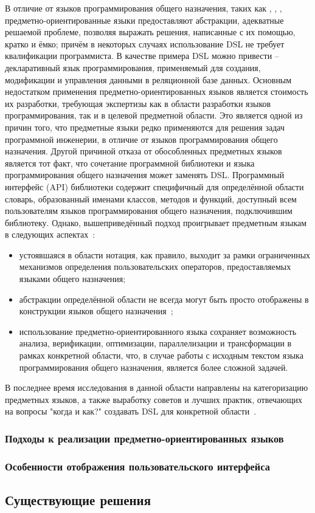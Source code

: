В отличие от языков программирования общего назначения, таких как ,
, , предметно-ориентированные языки предоставляют
абстракции, адекватные решаемой проблеме, позволяя выражать решения,
написанные с их помощью, кратко и ёмко; причём в некоторых случаях
использование DSL не требует квалификации программиста.
В качестве примера DSL можно привести  --  декларативный язык
программирования, применяемый для создания, модификации и управления данными в
реляционной базе данных.
Основным недостатком применения предметно-ориентированных языков является
стоимость их разработки, требующая экспертизы как в области разработки языков
программирования, так и в целевой предметной области.
Это является одной из причин того, что предметные языки редко применяются
для решения задач программной инженерии, в отличие от языков программирования
общего назначения.
Другой причиной отказа от обособленных предметных языков является тот факт,
что сочетание программной библиотеки и языка программирования общего
назначения может заменять DSL.
Программный интерфейс (API) библиотеки содержит специфичный для определённой
области словарь, образованный именами классов, методов и функций, доступный
всем пользователям языков программирования общего назначения, подключившим
библиотеку.
Однако, вышеприведённый подход проигрывает предметным языкам в следующих
аспектах~\cite{when-and-how-develop-dsl,dsl-spectrum-wile}:
\begin{itemize}
	\item устоявшаяся в области нотация, как правило, выходит за рамки
	ограниченных механизмов определения пользовательских операторов,
	предоставляемых языками общего назначения;
	\item абстракции определённой области не всегда могут быть
	просто отображены в конструкции языков общего назначения~\cite{dsl-traversal-transform};
	\item использование предметно-ориентированного языка сохраняет
	возможность анализа, верификации, оптимизации, параллелизации и
	трансформации в рамках конкретной области, что, в случае работы с
	исходным текстом языка программирования общего назначения, является
	более сложной задачей.
\end{itemize}

В последнее время исследования в данной области направлены на категоризацию
предметных языков, а также выработку советов и лучших практик, отвечающих на
вопросы "когда и как?" создавать DSL для конкретной области~\cite{when-and-how-develop-dsl,study-on-preliminary-approaches-develop-dsl,spinellis-dsl-patterns}.

\subsubsection{Подходы к реализации предметно-ориентированных языков}

\subsubsection{Особенности отображения пользовательского интерфейса}


\subsection{Существующие решения}
